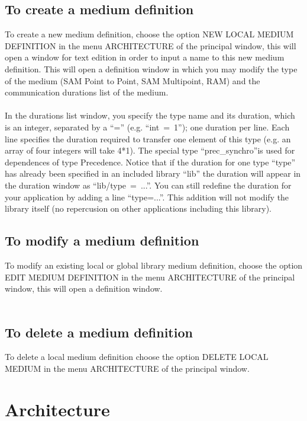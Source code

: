 \documentclass[11pt,twoside]{report}
\begin{document}
\subsection{To create a medium definition}
To create a new medium definition, choose the option NEW LOCAL MEDIUM
DEFINITION in the menu ARCHITECTURE of the principal window, this will
open a window for text edition in order to input a name to this new
medium definition. This will open a definition window in which you may
modify the type of the medium (SAM Point to Point, SAM Multipoint,
RAM) and the communication durations list of the medium.\\\\
In the durations list window, you specify the type name and its
duration, which is an integer, separated by a ``='' (e.g.
``int~=~1''); one duration per line. Each line specifies the duration
required to transfer one element of this type (e.g. an array of four
integers will take 4*1). The special type ``prec\_synchro''is used for
dependences of type Precedence. Notice that if the duration for one type
``type'' has already been specified in an included library ``lib'' the
duration will appear in the duration window as ``lib/type~=~...''. You
can still redefine the duration for your application by adding a line
``type=...''. This addition will not modify the library itself (no
repercusion on other applications including this library).


\subsection{To modify a medium definition}
To modify an existing local or global library medium definition, choose
the option EDIT MEDIUM DEFINITION in the menu ARCHITECTURE of the
principal window, this will open a definition window.\\\\

\subsection{To delete a medium definition}
To delete a local medium definition choose the option DELETE LOCAL MEDIUM in the menu ARCHITECTURE of the principal window.

\section{Architecture}
\end{document}
